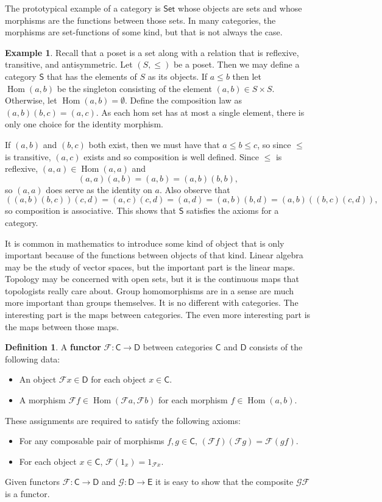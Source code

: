 \documentclass[MS, xcolor=dvipsnames]{wfuthesis}
\def\sC{\mathsf{C}}
\def\sD{\mathsf{D}}
\def\sE{\mathsf{E}}
\def\cF{\mathcal{F}}
\def\cG{\mathcal{G}}
\DeclareMathOperator{\Hom}{Hom}
\theoremstyle{definition}
\newtheorem{definition}[theorem]{Definition}
\newtheorem{example}[theorem]{Example}
\begin{document}
The prototypical example of a category is $\mathsf{Set}$ whose objects are sets and whose morphisms are the functions between those sets. In many categories, the morphisms are set-functions of some kind, but that is not always the case.
\begin{example}
  Recall that a poset is a set along with a relation that is reflexive, transitive, and antisymmetric. Let $(S,\le)$ be a poset. Then we may define a category $\mathsf S$ that has the elements of $S$ as its objects. If $a \le b$ then let $\Hom(a,b)$ be the singleton consisting of the element $(a,b) \in S \times S$. Otherwise, let $\Hom(a,b)=\emptyset$. Define the composition law as $(a,b)(b,c)=(a,c)$. As each hom set has at most a single element, there is only one choice for the identity morphism. \par
  If $(a,b)$ and $(b,c)$ both exist, then we must have that $a \le b \le c$, so since $\le$ is transitive, $(a,c)$ exists and so composition is well defined. Since $\le$ is reflexive, $(a,a) \in \Hom(a,a)$ and 
  \[ (a,a)(a,b) = (a,b) = (a,b)(b,b), \]
  so $(a,a)$ does serve as the identity on $a$. Also observe that 
  \[ ((a,b)(b,c))(c,d) = (a,c)(c,d) = (a,d) = (a,b)(b,d) = (a,b)((b,c)(c,d)), \]
  so composition is associative. This shows that $\mathsf S$ satisfies the axioms for a category. 
\end{example}
It is common in mathematics to introduce some kind of object that is only important because of the functions between objects of that kind. Linear algebra may be the study of vector spaces, but the important part is the linear maps. Topology may be concerned with open sets, but it is the continuous maps that topologists really care about. Group homomorphisms are in a sense are much more important than groups themselves. It is no different with categories. The interesting part is the maps between categories. The even more interesting part is the maps between those maps. 
\begin{definition}
  A \textbf{functor} $\cF: \sC \to \sD$ between categories $\sC$ and $\sD$ consists of the following data:
  \begin{itemize}
    \item An object $\cF x \in \sD$ for each object $x \in \sC$. 
    \item A morphism $\cF f \in \Hom(\cF a,\cF b)$ for each morphism $f \in \Hom(a,b)$. 
  \end{itemize}
  These assignments are required to satisfy the following axioms:
  \begin{itemize}
    \item For any composable pair of morphisms $f,g \in \sC$, $(\cF f) (\cF g) = \cF(gf)$. 
    \item For each object $x \in \sC$, $\cF(1_x) = 1_{\cF x}$. 
  \end{itemize}
  Given functors $\cF: \sC \to \sD$ and $\cG: \sD \to \sE$ it is easy to show that the composite $\cG \cF$ is a functor. 
\end{definition}
\end{document}
